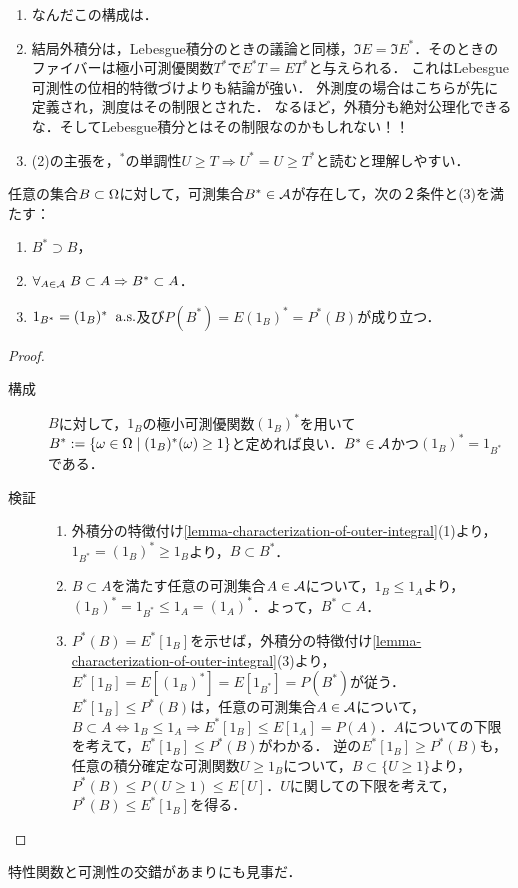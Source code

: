 \documentclass[uplatex,dvipdfmx]{jsreport}
\begin{document}
\begin{remarks}\mbox{}
    \begin{enumerate}
        \item なんだこの構成は．
        \item 結局外積分は，Lebesgue積分のときの議論と同様，$\Im E=\Im E^*$．そのときのファイバーは極小可測優関数$T^*$で$E^*T=ET^*$と与えられる．
        これはLebesgue可測性の位相的特徴づけよりも結論が強い．
        外測度の場合はこちらが先に定義され，測度はその制限とされた．
        なるほど，外積分も絶対公理化できるな．そしてLebesgue積分とはその制限なのかもしれない！！
        \item (2)の主張を，${}^*$の単調性$U\ge T\Rightarrow U^*=U\ge T^*$と読むと理解しやすい．
    \end{enumerate}
\end{remarks}

\begin{lemma}[外確率の特徴付け]
    任意の集合$B\subset\Omega$に対して，可測集合$B^*\in\mathcal{A}$が存在して，次の２条件と(3)を満たす：
    \begin{enumerate}
        \item $B^*\supset B$，
        \item $\forall_{A\in\mathcal{A}}\;B\subset A\Rightarrow B^*\subset A$．
        \item $1_{B^*}=(1_B)^*\;\;\mathrm{a.s.}$及び$P(B^*)=E(1_B)^*=P^*(B)$が成り立つ．
    \end{enumerate}
\end{lemma}
\begin{proof}\mbox{}
    \begin{description}
        \item[構成] $B$に対して，$1_B$の極小可測優関数$(1_B)^*$を用いて$B^*:=\left\{\omega\in\Omega\mid (1_B)^*(\omega)\ge 1\right\}$と定めれば良い．$B^*\in\mathcal{A}$かつ$(1_B)^*=1_{B^*}$である．
        \item[検証]
        \begin{enumerate}
            \item 外積分の特徴付け\ref{lemma-characterization-of-outer-integral}(1)より，$1_{B^*}=(1_B)^*\ge 1_B$より，$B\subset B^*$．
            \item $B\subset A$を満たす任意の可測集合$A\in\mathcal{A}$について，$1_B\le 1_A$より，$(1_B)^*=1_{B^*}\le 1_A=(1_A)^*$．よって，$B^*\subset A$．
            \item $P^*(B)=E^*[1_B]$を示せば，外積分の特徴付け\ref{lemma-characterization-of-outer-integral}(3)より，$E^*[1_B]=E[(1_B)^*]=E[1_{B^*}]=P(B^*)$が従う．
            $E^*[1_B]\le P^*(B)$は，任意の可測集合$A\in\mathcal{A}$について，$B\subset A\Leftrightarrow 1_B\le 1_A\Rightarrow E^*[1_B]\le E[1_A]=P(A)$．$A$についての下限を考えて，$E^*[1_B]\le P^*(B)$がわかる．
            逆の$E^*[1_B]\ge P^*(B)$も，任意の積分確定な可測関数$U\ge 1_B$について，$B\subset\{U\ge 1\}$より，$P^*(B)\le P(U\ge 1)\le E[U]$．$U$に関しての下限を考えて，$P^*(B)\le E^*[1_B]$を得る．
        \end{enumerate}
    \end{description}
\end{proof}
\begin{remarks}
    特性関数と可測性の交錯があまりにも見事だ．
\end{remarks}
\end{document}
